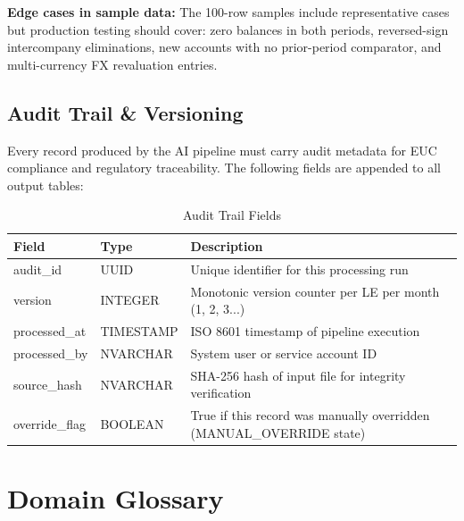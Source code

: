 \documentclass[11pt,a4paper]{article}
\begin{document}
\textbf{Edge cases in sample data:} The 100-row samples include representative cases but 
production testing should cover: zero balances in both periods, reversed-sign intercompany 
eliminations, new accounts with no prior-period comparator, and multi-currency FX revaluation entries.

\subsection{Audit Trail \& Versioning}

Every record produced by the AI pipeline must carry audit metadata for EUC compliance and 
regulatory traceability. The following fields are appended to all output tables:

\begin{table}[h]
\centering
\caption{Audit Trail Fields}
\begin{tabular}{@{}L{3cm}C{2.5cm}L{8.5cm}@{}}
\toprule
\textbf{Field} & \textbf{Type} & \textbf{Description} \\
\midrule
audit\_id & UUID & Unique identifier for this processing run \\
version & INTEGER & Monotonic version counter per LE per month (1, 2, 3...) \\
processed\_at & TIMESTAMP & ISO 8601 timestamp of pipeline execution \\
processed\_by & NVARCHAR & System user or service account ID \\
source\_hash & NVARCHAR & SHA-256 hash of input file for integrity verification \\
override\_flag & BOOLEAN & True if this record was manually overridden (MANUAL\_OVERRIDE state) \\
\bottomrule
\end{tabular}
\end{table}


\newpage
\section{Domain Glossary}
\end{document}
